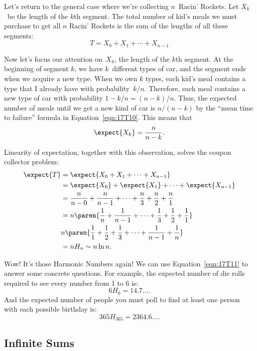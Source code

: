 Let's return to the general case where we're collecting $n$~Racin'
Rockets.  Let $X_k$~be the length of the $k$th segment.  The total
number of kid's meals we must purchase to get all $n$ Racin' Rockets is
the sum of the lengths of all these segments:
%
\[
T = X_0 + X_1 + \cdots + X_{n-1}
\]

Now let's focus our attention on~$X_k$, the length of the $k$th
segment.  At the beginning of segment $k$, we have $k$~different types
of car, and the segment ends when we acquire a new type.  When we own
$k$ types, each kid's meal contains a type that I already have with
probability~$k / n$.  Therefore, each meal contains a new type of car
with probability $1 - k / n = (n - k) / n$.  Thus, the expected number
of meals until we get a new kind of car is $n / (n - k)$ by the ``mean
time to failure'' formula in Equation~\ref{eqn:17T10}.  This means
that
%
\[
    \expect{X_k} = \frac{n}{n - k}.
\]

Linearity of expectation, together with this observation, solves the
coupon collector problem:
%
\begingroup
\openup\jot
\begin{align}
\expect{T}
  & = \expect{X_0 + X_1 + \cdots + X_{n-1}} \notag\\
%
  & = \expect{X_0} + \expect{X_1} + \cdots + \expect{X_{n-1}} \notag\\
%
  & = \frac{n}{n - 0} + \frac{n}{n - 1} + \cdots + \frac{n}{3} +
    \frac{n}{2} + \frac{n}{1} \notag\\
%
  & = n \paren{\frac{1}{n} + \frac{1}{n-1} + \cdots + \frac{1}{3} +
  \frac{1}{2} + \frac{1}{1}} \notag\\
%
  & n \paren{\frac{1}{1} + \frac{1}{2} + \frac{1}{3} + \cdots +
      \frac{1}{n-1} + \frac{1}{n}} \notag\\
%
  & = n H_n \sim n \ln n. \label{eqn:17T11}
\end{align}
\endgroup

Wow!  It's those Harmonic Numbers again!  We can use
Equation~\ref{eqn:17T11} to answer some concrete questions.  For
example, the expected number of die rolls required to see every number
from 1 to 6 is:
%
\[
    6 H_6 = 14.7 \dots.
\]
%
And the expected number of people you must poll to find at least one
person with each possible birthday is:
%
\[
    365 H_{365} = 2364.6\dots.
\]


\subsection{Infinite Sums}

